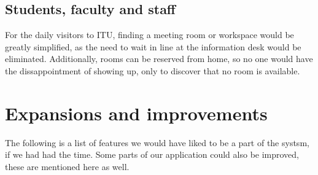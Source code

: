 \subsection{Students, faculty and staff}
For the daily visitors to ITU, finding a meeting room or workspace would be greatly simplified, as the need to wait in line at the information desk would be eliminated. Additionally, rooms can be reserved from home, so no one would have the dissappointment of showing up, only to discover that no room is available.

\section{Expansions and improvements}
The following is a list of features we would have liked to be a part of the systsm, if we had had the time. Some parts of our application could also be improved, these are mentioned here as well.

